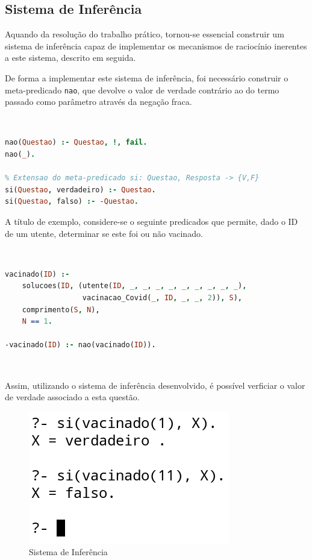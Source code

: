 \documentclass[a4paper, 11pt]{article}
\begin{document}
\pagebreak

\subsection{Sistema de Inferência}

Aquando da resolução do trabalho prático, tornou-se essencial construir um sistema de inferência capaz de implementar
os mecanismos de raciocínio inerentes a este sistema, descrito em seguida.

De forma a implementar este sistema de inferência, foi necessário construir o meta-predicado \texttt{nao}, que devolve
o valor de verdade contrário ao do termo passado como parâmetro através da negação fraca.


\

\begin{lstlisting}[language=Prolog, caption={Sistema de Inferência}]
% Extensao do meta-predicado nao: Questao -> {V,F}
nao(Questao) :- Questao, !, fail.
nao(_).

% Extensao do meta-predicado si: Questao, Resposta -> {V,F}
si(Questao, verdadeiro) :- Questao.
si(Questao, falso) :- -Questao.
\end{lstlisting}

A título de exemplo, considere-se o seguinte predicados que permite, dado o ID de um utente, determinar se este foi
ou não vacinado.

\

\begin{lstlisting}[language=Prolog, caption={Predicados que permitem determinar se um utente foi vacinado}]
% Extensao do predicado vacinado: ID -> {V, F}
vacinado(ID) :- 
    solucoes(ID, (utente(ID, _, _, _, _, _, _, _, _, _),
                  vacinacao_Covid(_, ID, _, _, 2)), S),
    comprimento(S, N),
    N == 1.

-vacinado(ID) :- nao(vacinado(ID)).
\end{lstlisting}

\ 

Assim, utilizando o sistema de inferência desenvolvido, é possível verficiar o valor de verdade associado a esta questão.

\begin{figure}[H]
    \centering
    \includegraphics[width=.27\textwidth]{img/si.png}
    \caption{Sistema de Inferência}
\end{figure}
\end{document}
